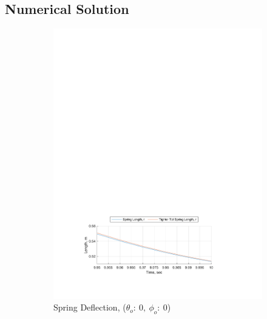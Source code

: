 \documentclass[12pt]{report}
\begin{document}
\begin{flushleft}
\subsection{Numerical Solution} \label{appendix:numerical}
\begin{figure}[!htp]
  \caption{Comparison Plots of ode45 Tolerance Options}
  \begin{subfigure}{\textwidth}
    \includegraphics[center]{1}
    \caption*{Spring Deflection, ($\theta_o:~0,~\phi_o:~0$)}
  \end{subfigure}
  \begin{subfigure}{\textwidth}

\end{subfigure}
\end{figure}
\end{flushleft}
\end{document}
